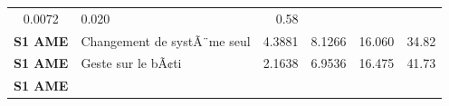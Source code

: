 \documentclass[]{article}
\begin{document}
\begin{longtable}[]{@{}clrrrr@{}}
\begin{minipage}[t]{0.09\columnwidth}
0.0072\strut
\end{minipage} & \begin{minipage}[t]{0.09\columnwidth}\raggedleft\strut
0.020\strut
\end{minipage} & \begin{minipage}[t]{0.09\columnwidth}\raggedleft\strut
0.58\strut
\end{minipage}\tabularnewline
\begin{minipage}[t]{0.17\columnwidth}\centering\strut
\textbf{S1 AME}\strut
\end{minipage} & \begin{minipage}[t]{0.29\columnwidth}\raggedright\strut
Changement de systÃ¨me seul\strut
\end{minipage} & \begin{minipage}[t]{0.09\columnwidth}\raggedleft\strut
4.3881\strut
\end{minipage} & \begin{minipage}[t]{0.09\columnwidth}\raggedleft\strut
8.1266\strut
\end{minipage} & \begin{minipage}[t]{0.09\columnwidth}\raggedleft\strut
16.060\strut
\end{minipage} & \begin{minipage}[t]{0.09\columnwidth}\raggedleft\strut
34.82\strut
\end{minipage}\tabularnewline
\begin{minipage}[t]{0.17\columnwidth}\centering\strut
\textbf{S1 AME}\strut
\end{minipage} & \begin{minipage}[t]{0.29\columnwidth}\raggedright\strut
Geste sur le bÃ¢ti\strut
\end{minipage} & \begin{minipage}[t]{0.09\columnwidth}\raggedleft\strut
2.1638\strut
\end{minipage} & \begin{minipage}[t]{0.09\columnwidth}\raggedleft\strut
6.9536\strut
\end{minipage} & \begin{minipage}[t]{0.09\columnwidth}\raggedleft\strut
16.475\strut
\end{minipage} & \begin{minipage}[t]{0.09\columnwidth}\raggedleft\strut
41.73\strut
\end{minipage}\tabularnewline
\begin{minipage}[t]{0.17\columnwidth}\centering\strut
\textbf{S1 AME}\strut
\end{minipage} & \begin{minipage}[t]{0.29\columnwidth}\raggedright\strut

\end{minipage}
\end{longtable}
\end{document}
